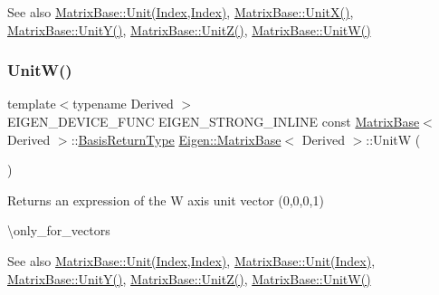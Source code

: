\begin{DoxySeeAlso}{See also}
\mbox{\hyperlink{class_eigen_1_1_matrix_base_a1f39dde25807c1f008aa874e690b3fed}{Matrix\+Base\+::\+Unit(\+Index,\+Index)}}, \mbox{\hyperlink{class_eigen_1_1_matrix_base_ac12aa899494685551e11f238836ee600}{Matrix\+Base\+::\+Unit\+X()}}, \mbox{\hyperlink{class_eigen_1_1_matrix_base_ab8e21066a2e5cf5ca8bb0383e44a6efa}{Matrix\+Base\+::\+Unit\+Y()}}, \mbox{\hyperlink{class_eigen_1_1_matrix_base_a122e525a8f5ef3e4d459055615f662de}{Matrix\+Base\+::\+Unit\+Z()}}, \mbox{\hyperlink{class_eigen_1_1_matrix_base_ac28c3d440440464b1fc8d9f2a6d5624a}{Matrix\+Base\+::\+Unit\+W()}} 
\end{DoxySeeAlso}
\mbox{\label{class_eigen_1_1_matrix_base_ac28c3d440440464b1fc8d9f2a6d5624a}} 
\subsubsection{\texorpdfstring{UnitW()}{UnitW()}}
{\footnotesize\ttfamily template$<$typename Derived $>$ \\
E\+I\+G\+E\+N\+\_\+\+D\+E\+V\+I\+C\+E\+\_\+\+F\+U\+NC E\+I\+G\+E\+N\+\_\+\+S\+T\+R\+O\+N\+G\+\_\+\+I\+N\+L\+I\+NE const \mbox{\hyperlink{class_eigen_1_1_matrix_base}{Matrix\+Base}}$<$ Derived $>$\+::\mbox{\hyperlink{class_eigen_1_1_block}{Basis\+Return\+Type}} \mbox{\hyperlink{class_eigen_1_1_matrix_base}{Eigen\+::\+Matrix\+Base}}$<$ Derived $>$\+::UnitW (\begin{DoxyParamCaption}{ }\end{DoxyParamCaption})\hspace{0.3cm}{\ttfamily [static]}}

\begin{DoxyReturn}{Returns}
an expression of the W axis unit vector (0,0,0,1)
\end{DoxyReturn}
\textbackslash{}only\+\_\+for\+\_\+vectors

\begin{DoxySeeAlso}{See also}
\mbox{\hyperlink{class_eigen_1_1_matrix_base_a1f39dde25807c1f008aa874e690b3fed}{Matrix\+Base\+::\+Unit(\+Index,\+Index)}}, \mbox{\hyperlink{class_eigen_1_1_matrix_base_a9d7e97faf7755d3e85e831153f02846c}{Matrix\+Base\+::\+Unit(\+Index)}}, \mbox{\hyperlink{class_eigen_1_1_matrix_base_ab8e21066a2e5cf5ca8bb0383e44a6efa}{Matrix\+Base\+::\+Unit\+Y()}}, \mbox{\hyperlink{class_eigen_1_1_matrix_base_a122e525a8f5ef3e4d459055615f662de}{Matrix\+Base\+::\+Unit\+Z()}}, \mbox{\hyperlink{class_eigen_1_1_matrix_base_ac28c3d440440464b1fc8d9f2a6d5624a}{Matrix\+Base\+::\+Unit\+W()}} 
\end{DoxySeeAlso}
\mbox{\label{class_eigen_1_1_matrix_base_ac12aa899494685551e11f238836ee600}} 
